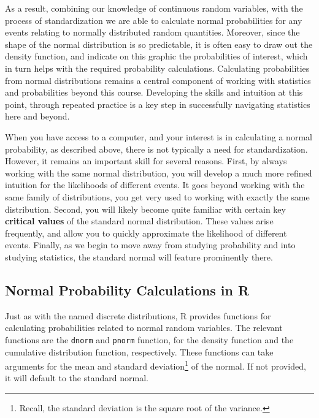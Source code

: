\documentclass[
  letterpaper,
  DIV=11,
  numbers=noendperiod]{scrreprt}
\theoremstyle{definition}
\theoremstyle{definition}
\theoremstyle{definition}
\theoremstyle{remark}
\begin{document}
As a result, combining our knowledge of continuous random variables,
with the process of standardization we are able to calculate normal
probabilities for any events relating to normally distributed random
quantities. Moreover, since the shape of the normal distribution is so
predictable, it is often easy to draw out the density function, and
indicate on this graphic the probabilities of interest, which in turn
helps with the required probability calculations. Calculating
probabilities from normal distributions remains a central component of
working with statistics and probabilities beyond this course. Developing
the skills and intuition at this point, through repeated practice is a
key step in successfully navigating statistics here and beyond.

When you have access to a computer, and your interest is in calculating
a normal probability, as described above, there is not typically a need
for standardization. However, it remains an important skill for several
reasons. First, by always working with the same normal distribution, you
will develop a much more refined intuition for the likelihoods of
different events. It goes beyond working with the same family of
distributions, you get very used to working with exactly the same
distribution. Second, you will likely become quite familiar with certain
key \textbf{critical values} of the standard normal distribution. These
values arise frequently, and allow you to quickly approximate the
likelihood of different events. Finally, as we begin to move away from
studying probability and into studying statistics, the standard normal
will feature prominently there.

\subsection{Normal Probability Calculations in R}\label{sec-r-normal}

Just as with the named discrete distributions, R provides functions for
calculating probabilities related to normal random variables. The
relevant functions are the \texttt{dnorm} and \texttt{pnorm} function,
for the density function and the cumulative distribution function,
respectively. These functions can take arguments for the mean and
standard deviation\footnote{Recall, the standard deviation is the square
  root of the variance.} of the normal. If not provided, it will default
to the standard normal.
\end{document}
